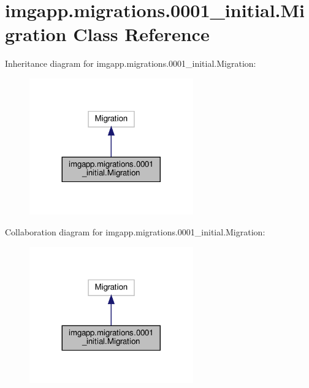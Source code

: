 \hypertarget{classimgapp_1_1migrations_1_10001__initial_1_1Migration}{}\section{imgapp.\+migrations.0001\+\_\+initial.Migration Class Reference}
\label{classimgapp_1_1migrations_1_10001__initial_1_1Migration}


Inheritance diagram for imgapp.\+migrations.0001\+\_\+initial.Migration\+:
\nopagebreak
\begin{figure}[H]
\begin{center}
\leavevmode
\includegraphics[width=200pt]{classimgapp_1_1migrations_1_10001__initial_1_1Migration__inherit__graph}
\end{center}
\end{figure}


Collaboration diagram for imgapp.\+migrations.0001\+\_\+initial.Migration\+:
\nopagebreak
\begin{figure}[H]
\begin{center}
\leavevmode
\includegraphics[width=200pt]{classimgapp_1_1migrations_1_10001__initial_1_1Migration__coll__graph}
\end{center}
\end{figure}
